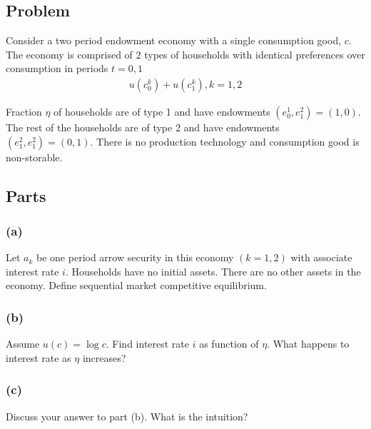 \documentclass[10pt, a4paper]{article}
\begin{document}
\subsection*{Problem}
Consider a two period endowment economy with a single consumption good, $c$. The economy is comprised of 2 types of households with identical preferences over consumption in periods $t = 0,1$
\begin{gather*}
  u(c^k_0) + u(c^k_1), k = 1,2
\end{gather*}

Fraction $\eta$ of households are of type 1 and have endowments $(e^1_0, e^2_1) = (1,0)$. The rest of the households are of type 2 and have endowments $(e^2_1, e^2_1) = (0,1)$. There is no production technology and consumption good is non-storable.

\subsection*{Parts}
\subsubsection*{(a)}
Let $a_k$ be one period arrow security in this economy $(k = 1,2)$ with associate interest rate $i$. Households have no initial assets. There are no other assets in the economy. Define sequential market competitive equilibrium.

\subsubsection*{(b)}
Assume $u(c) = \log c$. Find interest rate $i$ as function of $\eta$. What happens to interest rate as $\eta$ increases?

\subsubsection*{(c)}
Discuss your answer to part (b). What is the intuition?
\end{document}
